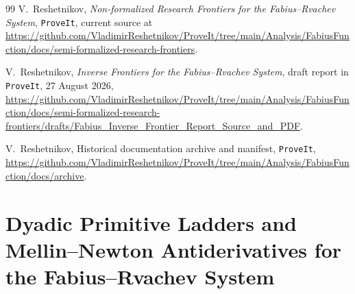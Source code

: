 \documentclass[11pt,oneside]{article}
\newcommand{\newsharedtheorem}[2]{%
  \newaliascnt{#1}{theorem}%
  \newtheorem{#1}[#1]{#2}%
  \aliascntresetthe{#1}%
}
\newcommand{\integrationreportreset}{%
  \clearpage
  \setcounter{section}{0}%
  \renewcommand{\thesection}{\arabic{section}}}
\theoremstyle{definition}
\theoremstyle{remark}
\newcommand{\1}{\mathbf 1}
\begin{document}
\begin{thebibliography}{99}
V.~Reshetnikov,
\newblock \emph{Non-formalized Research Frontiers for the Fabius--Rvachev System},
\newblock \texttt{ProveIt}, current source at
\url{https://github.com/VladimirReshetnikov/ProveIt/tree/main/Analysis/FabiusFunction/docs/semi-formalized-research-frontiers}.

V.~Reshetnikov,
\newblock \emph{Inverse Frontiers for the Fabius--Rvachev System},
\newblock draft report in \texttt{ProveIt}, 27 August 2026,
\url{https://github.com/VladimirReshetnikov/ProveIt/tree/main/Analysis/FabiusFunction/docs/semi-formalized-research-frontiers/drafts/Fabius_Inverse_Frontier_Report_Source_and_PDF}.

V.~Reshetnikov,
\newblock Historical documentation archive and manifest,
\newblock \texttt{ProveIt},
\url{https://github.com/VladimirReshetnikov/ProveIt/tree/main/Analysis/FabiusFunction/docs/archive}.

\end{thebibliography}


\newcommand{\QPartl}{\mathbb Q}
\newcommand{\sincPartl}{\operatorname{sinc}}
\newcommand{\wtPartl}{s_2}
\newcommand{\FP}{\operatorname{FP}}
\newcommand{\Bell}{\mathcal B}
\newcommand{\repoPartl}{\textsc{ProveIt}}
\newsharedtheorem{problem}{Open problem}

\integrationreportreset
\part[Dyadic primitive ladders and Mellin--Newton antiderivatives]
{Dyadic Primitive Ladders and Mellin--Newton Antiderivatives for the Fabius--Rvachev System}
\end{document}
